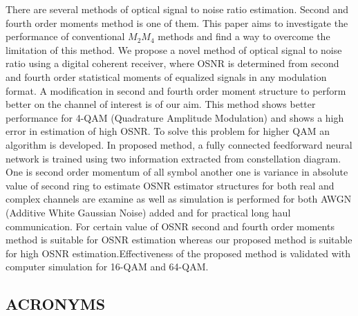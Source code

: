 \documentclass[12pt]{report}
\begin{document}
	There are several methods of optical signal to noise ratio estimation. Second and fourth order moments method is one of them. This paper aims to investigate the performance of conventional $M_2M_4$ methods and find a way to overcome the limitation of this method. We propose a novel method of optical signal to noise ratio using a digital coherent receiver, where OSNR is determined from second and fourth order statistical moments of equalized signals in any modulation format. A modification in second and fourth order moment structure to perform better on the channel of interest is of our aim. This method shows better performance for 4-QAM (Quadrature Amplitude Modulation) and shows a high error in estimation of high OSNR. To solve this problem for higher QAM an algorithm is developed. In proposed method, a fully connected feedforward neural network is trained using two information extracted from constellation diagram. One is second order momentum of all symbol another one is variance in absolute value of second ring to estimate OSNR estimator structures for both real and complex channels are examine as well as simulation is performed for both AWGN (Additive White Gaussian Noise) added and for practical long haul communication. For certain value of OSNR second and fourth order moments method is suitable for OSNR estimation whereas our proposed method is suitable for high OSNR estimation.Effectiveness of the proposed method is validated with computer simulation for 16-QAM and 64-QAM. 

	\listoffigures
	\pagebreak
\begin{center}
	\section*{ACRONYMS}
\end{center}
\begin{acronym}
	
\end{acronym}
	\tableofcontents
	
	
	
	
	
\end{document}
